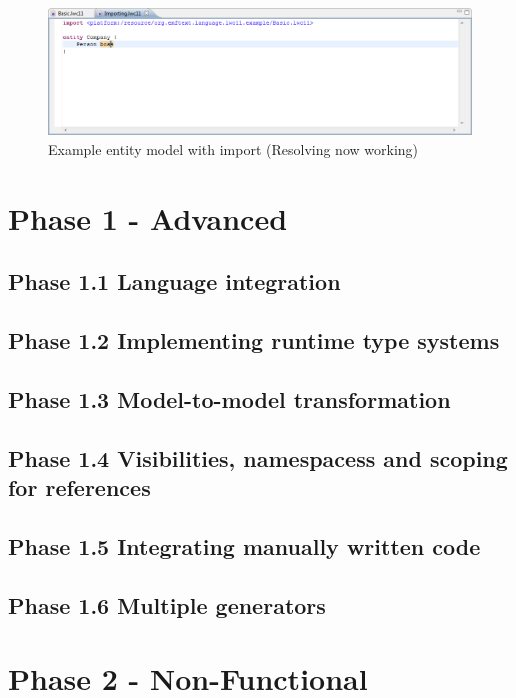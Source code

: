 \documentclass[10pt, pdftex]{llncs}
\begin{document}
\begin{figure}
	\centering
	\includegraphics[width=1.00\textwidth]{figures/importexample2.png}
	\caption{Example entity model with import (Resolving now working)}
	\label{fig:importexample2}
\end{figure}


\section{Phase 1 - Advanced}

\subsection{Phase 1.1 Language integration}

\subsection{Phase 1.2 Implementing runtime type systems}

\subsection{Phase 1.3 Model-to-model transformation}

\subsection{Phase 1.4 Visibilities, namespacess and scoping for references}

\subsection{Phase 1.5 Integrating manually written code}

\subsection{Phase 1.6 Multiple generators}

\section{Phase 2 - Non-Functional}
\end{document}
